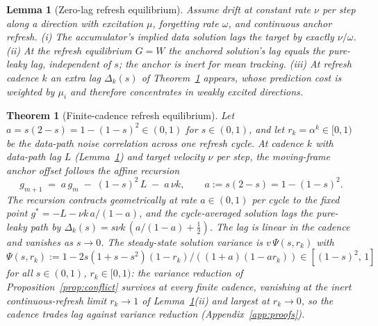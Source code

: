 \documentclass[10pt]{article}
\newtheorem{theorem}{Theorem}
\newtheorem{lemma}{Lemma}
\begin{document}
\begin{lemma}[Zero-lag refresh equilibrium]
\label{lem:zerolag}
Assume drift at constant rate $\nu$ per step along a direction with excitation $\mu$, forgetting rate $\omega$, and continuous anchor refresh.
(i) The accumulator's implied data solution lags the target by exactly $\nu/\omega$.
(ii) At the refresh equilibrium $G = W$ the anchored solution's lag equals the pure-leaky lag, independent of $s$; the anchor is inert for mean tracking.
(iii) At refresh cadence $k$ an extra lag $\Delta_k(s)$ of Theorem~\ref{thm:cadence} appears, whose prediction cost is weighted by $\mu_i$ and therefore concentrates in weakly excited directions.
\end{lemma}

\begin{theorem}[Finite-cadence refresh equilibrium]
\label{thm:cadence}
Let $a = s(2-s) = 1 - (1-s)^2 \in (0,1)$ for $s \in (0,1)$, and let $r_k = \alpha^k \in [0,1)$ be the data-path noise correlation across one refresh cycle.
At cadence $k$ with data-path lag $L$ (Lemma~\ref{lem:zerolag}) and target velocity $\nu$ per step, the moving-frame anchor offset follows the affine recursion
\[
  g_{m+1} \;=\; a\,g_m \;-\; (1-s)^2\,L \;-\; a\,\nu k,
  \qquad a := s(2-s) = 1-(1-s)^2.
\]
The recursion contracts geometrically at rate $a \in (0,1)$ per cycle to the fixed point $g^* = -L - \nu k\,a/(1-a)$, and the cycle-averaged solution lags the pure-leaky path by $\Delta_k(s) = s\nu k\,(a/(1-a) + \tfrac{1}{2})$.
The lag is linear in the cadence and vanishes as $s \to 0$.
The steady-state solution variance is $v\,\Psi(s,r_k)$ with $\Psi(s,r_k) := 1 - 2s(1+s-s^2)(1-r_k)/((1+a)(1-a r_k)) \in [(1-s)^2,\,1]$ for all $s \in (0,1)$, $r_k \in [0,1)$: the variance reduction of Proposition~\ref{prop:conflict} survives at every finite cadence, vanishing at the inert continuous-refresh limit $r_k \to 1$ of Lemma~\ref{lem:zerolag}(ii) and largest at $r_k \to 0$, so the cadence trades lag against variance reduction (Appendix~\ref{app:proofs}).
\end{theorem}
\end{document}

